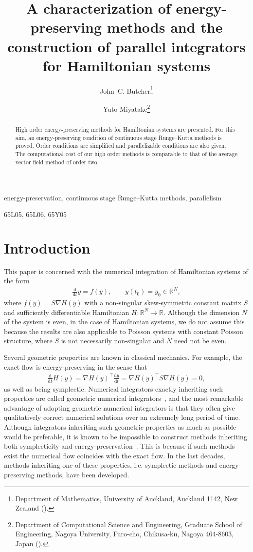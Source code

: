 \documentclass[final,leqno,onefignum,onetabnum]{siamltex1213}
\title{A characterization of energy-preserving methods and the construction
of parallel integrators for Hamiltonian systems}
\author{John~C. Butcher\thanks{Department of Mathematics, University of Auckland,
Auckland 1142, New Zealand
(\email{butcher@math.auckland.ac.nz}).}
\and
Yuto Miyatake\thanks{Department of Computational Science and Engineering,
Graduate School of Engineering, Nagoya University, Furo-cho, Chikusa-ku,
Nagoya 464-8603, Japan
(\email{miyatake@na.cse.nagoya-u.ac.jp}).}}
\begin{document}
\maketitle
{}

\begin{abstract}
High order energy-preserving methods for Hamiltonian systems are presented.
For this aim, an energy-preserving condition of continuous stage Runge--Kutta methods
is proved.
Order conditions are simplified and parallelizable conditions are also given.
The computational cost of our high order methods is comparable to
that of the average vector field method of order two.
\end{abstract}

\begin{keywords}
energy-preservation, continuous stage Runge--Kutta methods, parallelism
\end{keywords}

\begin{AMS}
65L05, 65L06, 65Y05
\end{AMS}

\pagestyle{myheadings}
\thispagestyle{plain}
\markboth{}{}

\section{Introduction}
This paper is
concerned with the numerical integration of
Hamiltonian systems  
of the form
\begin{align}
\frac{\mathrm d}{{\mathrm d} t}y = f(y),\qquad y(t_0)=y_0\in\mathbb{R}^N,
\end{align}
where $f(y) = S\nabla H(y)$
with a non-singular skew-symmetric constant matrix $S$
and sufficiently differentiable Hamiltonian $H:\mathbb{R}^N\to\mathbb{R}$.
Although the dimension $N$ of the system is even, in the case of
Hamiltonian systems, we do not assume this because the results
are also applicable to Poisson systems
with constant Poisson structure, where $S$ is not necessarily non-singular and
$N$ need not be even.

Several geometric properties are known in classical mechanics. 
For example,
the exact flow is energy-preserving in the sense that
\begin{align}
\frac{\mathrm d}{{\mathrm d} t}H(y) = \nabla H(y)^\top \frac{{\mathrm d} y}{{\mathrm d} t}
= \nabla H(y) ^\top S \nabla H(y) = 0,
\end{align}
as well as being symplectic.
Numerical integrators exactly inheriting such properties 
are called geometric numerical integrators~\cite{ha06},
and the most remarkable advantage of adopting geometric numerical integrators
is that they often give qualitatively correct numerical solutions 
over an extremely long period of time.
Although 
integrators inheriting such geometric properties as much as possible
would be preferable,
it is known to be impossible to construct 
methods inheriting both symplecticity and energy-preservation~\cite{cfm06,zh88}.
This is because if such methods exist the numerical flow coincides with the exact flow.
In the last decades,
methods inheriting one of these properties, i.e. symplectic methods
and energy-preserving methods, have been developed. 
\end{document}
